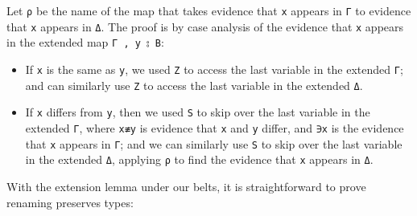 Let \texttt{ρ} be the name of the map that takes evidence that
\texttt{x} appears in \texttt{Γ} to evidence that \texttt{x} appears in
\texttt{Δ}. The proof is by case analysis of the evidence that
\texttt{x} appears in the extended map \texttt{Γ\ ,\ y\ ⦂\ B}:

\begin{itemize}
\item
  If \texttt{x} is the same as \texttt{y}, we used \texttt{Z} to access
  the last variable in the extended \texttt{Γ}; and can similarly use
  \texttt{Z} to access the last variable in the extended \texttt{Δ}.
\item
  If \texttt{x} differs from \texttt{y}, then we used \texttt{S} to skip
  over the last variable in the extended \texttt{Γ}, where \texttt{x≢y}
  is evidence that \texttt{x} and \texttt{y} differ, and \texttt{∋x} is
  the evidence that \texttt{x} appears in \texttt{Γ}; and we can
  similarly use \texttt{S} to skip over the last variable in the
  extended \texttt{Δ}, applying \texttt{ρ} to find the evidence that
  \texttt{x} appears in \texttt{Δ}.
\end{itemize}

With the extension lemma under our belts, it is straightforward to prove
renaming preserves types:

